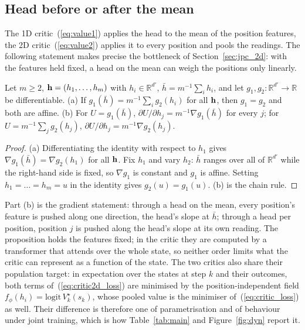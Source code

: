 \subsection{Head before or after the mean}
\label{app:additive}
The 1D critic~(\ref{eq:value1}) applies the head to the mean of the position features, the 2D critic~(\ref{eq:value2}) applies it to every position and pools the readings. The following statement makes precise the bottleneck of Section~\ref{sec:jpc_2d}: with the features held fixed, a head on the mean can weigh the positions only linearly.
\begin{proposition}
\label{prop:additive}
Let $m\ge2$, ${\mathbf{h}}=(h_1,\dots,h_m)$ with $h_i\in\mathbb R^{d'}$, $\bar h=m^{-1}\sum_ih_i$, and let $g_1,g_2:\mathbb R^{d'}\to\mathbb R$ be differentiable.
\textup{(a)} If $g_1(\bar h)=m^{-1}\sum_ig_2(h_i)$ for all ${\mathbf{h}}$, then $g_1=g_2$ and both are affine.
\textup{(b)} For $U=g_1(\bar h)$, $\partial U/\partial h_j=m^{-1}\nabla g_1(\bar h)$ for every $j$; for $U=m^{-1}\sum_jg_2(h_j)$, $\partial U/\partial h_j=m^{-1}\nabla g_2(h_j)$.
\end{proposition}
\begin{proof}
(a) Differentiating the identity with respect to $h_1$ gives $\nabla g_1(\bar h)=\nabla g_2(h_1)$ for all ${\mathbf{h}}$. Fix $h_1$ and vary $h_2$: $\bar h$ ranges over all of $\mathbb R^{d'}$ while the right-hand side is fixed, so $\nabla g_1$ is constant and $g_1$ is affine. Setting $h_1=\dots=h_m=u$ in the identity gives $g_2(u)=g_1(u)$. (b) is the chain rule.
\end{proof}
Part (b) is the gradient statement: through a head on the mean, every position's feature is pushed along one direction, the head's slope at $\bar h$; through a head per position, position $j$ is pushed along the head's slope at its own reading. The proposition holds the features fixed; in the critic they are computed by a transformer that attends over the whole state, so neither order limits what the critic can represent as a function of the state. The two critics also share their population target: in expectation over the states at step $k$ and their outcomes, both terms of~(\ref{eq:critic2d_loss}) are minimised by the position-independent field $f_\phi(h_i)=\mathrm{logit}\,V^\star_k(s_k)$, whose pooled value is the minimiser of~(\ref{eq:critic_loss}) as well. Their difference is therefore one of parametrisation and of behaviour under joint training, which is how Table~\ref{tab:main} and Figure~\ref{fig:dyn} report it.

